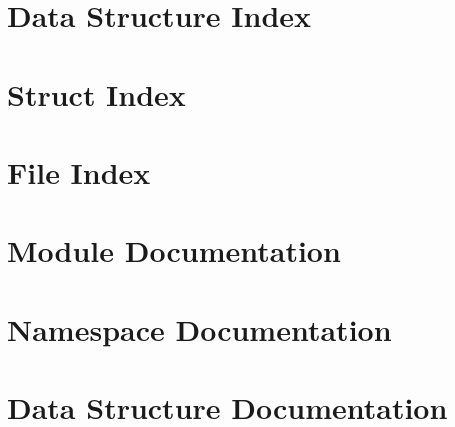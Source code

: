 \let\mypdfximage\pdfximage\def\pdfximage{\immediate\mypdfximage}\documentclass[twoside]{book}
\newcommand{\+}{\discretionary{\mbox{\scriptsize$\hookleftarrow$}}{}{}}
\begin{document}
\chapter{Data Structure Index}

\chapter{Struct Index}

\chapter{File Index}

\chapter{Module Documentation}































\chapter{Namespace Documentation}












\chapter{Data Structure Documentation}














\end{document}
